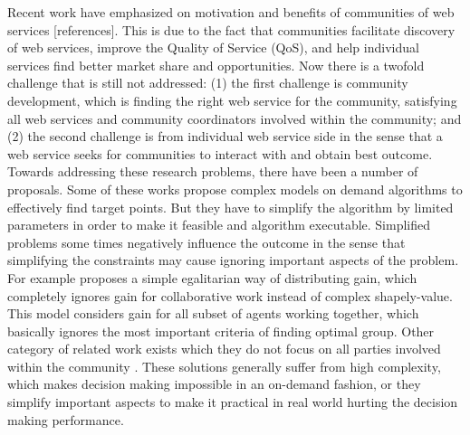 \documentclass[10pt,journal,cspaper,compsoc]{IEEEtran}
\begin{document}
Recent work have emphasized on motivation and benefits of communities of web services [references]. This is due to the fact that communities facilitate discovery of web services, improve the Quality of Service (QoS), and help individual services find better market share and opportunities. Now there is a twofold challenge that is still not addressed: (1) the first challenge is community development, which is finding the right web service for the community, satisfying all web services and community coordinators involved within the community; and (2) the second challenge is from individual web service side in the sense that a web service seeks for communities to interact with and obtain best outcome. Towards addressing these research problems, there have been a number of proposals. Some of these works propose complex models on demand algorithms \cite{DBLP:conf/IEEEscc/LimTMB12, 10.1109/TSC.2012.12, 10.1109/TSC.2014.2312940} to effectively find target points. But they have to simplify the algorithm by limited parameters in order to make it feasible and algorithm executable. Simplified problems some times negatively influence the outcome in the sense that simplifying the constraints may cause ignoring important aspects of the problem. For example \cite{10.1109/TSC.2012.12} proposes a simple egalitarian way of distributing gain, which completely ignores gain for collaborative work instead of complex shapely-value. This model considers gain for all subset of agents working together, which basically ignores the most important criteria of finding optimal group. Other category of related work exists which they do not focus on all parties involved within the community \cite{DBLP:conf/IEEEscc/KhosravifarABT11}. 
These solutions generally suffer from high complexity, which makes decision making impossible in an on-demand fashion, or they simplify important aspects to make it practical in real world hurting the decision making performance. 
\end{document}
